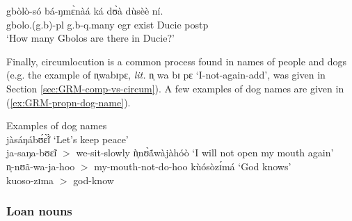 \begin{exe}
\begin{exe}
\begin{exe}
{\begin{exe}
\begin{exe}
\begin{exe}
\begin{exe}
\begin{exe}
  \begin{exe}
   \ex\label{ex:GRM-propn-noun-plur}
\gll  gbòlò-só bá-ŋmɛ̀nàá ká dʊ̀à dùsèè ní.\\
gbolo.({\sc g.}b)-{\sc pl}  {\sc g.}b-{\sc q}.many {\sc  egr} exist Ducie {\sc
postp}\\
\glt  `How many Gbolos are there in Ducie?' 
 \z

Finally, circumlocution is a common process found in names of people and dogs 
 (e.g. the example of {\sls n̩wabɪpɛ}, 
{\it lit.}  {\sls n̩ wa bɪ pɛ}  `I-not-again-add', was given in Section
\ref{sec:GRM-comp-vs-circum}).   A few examples of dog names are given in
(\ref{ex:GRM-propn-dog-name}).


  \ea\label{ex:GRM-propn-dog-name}{\rm Examples of dog names}\\
 

 \ea\label{ex:GRM-propn-dog-name-1} 
{\sls jàsáŋábʊ́ɛ̃̀ɪ̀} {\rm  `Let's keep peace'}\\ 
ja-saŋa-bʊɛ̃ɪ   $>$  {\rm we-sit-slowly } 
 \ex\label{ex:GRM-propn-dog-name-2} 
{\sls ǹ̩nʊ̀ã́wàjàhóò}  {\rm  `I will not open my mouth again'}\\ 
 n̩-nʊã-wa-ja-hoo  $>$ {\rm my-mouth-not-do-hoo}
 \ex\label{ex:GRM-propn-dog-name-3} 
{\sls kùósòzɪ́má}   {\rm `God knows'}\\  
kuoso-zɪma $>$ {\rm  god-know}

\z 
 \z






\subsubsection{Loan nouns}
\label{sec:GRM-borr-noun}



\end{exe}
\end{exe}
\end{exe}
\end{exe}
\end{exe}
\end{exe}}
\end{exe}
\end{exe}
\end{exe}
